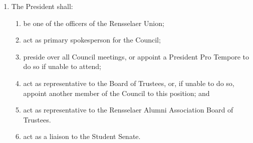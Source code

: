 \documentclass{union-doc}
\begin{document}


\begin{enumerate}
\item The President shall:
  \begin{enumerate}
  \item be one of the officers of the Rensselaer Union;
  \item act as primary spokesperson for the Council;
  \item preside over all Council meetings, or appoint a President Pro Tempore to do so if unable to attend;
  \item act as representative to the Board of Trustees, or, if unable to do so, appoint another member of the Council to this position; and
  \item act as representative to the Rensselaer Alumni Association Board of Trustees.
  \item act as a liaison to the Student Senate.
  \end{enumerate}
\end{enumerate}

\end{document}
